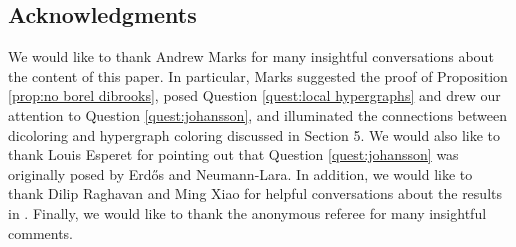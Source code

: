 \documentclass[psamsfonts]{amsart}
\theoremstyle{definition}
\theoremstyle{remark}
\numberwithin{equation}{section}
\begin{document}
\subsection*{Acknowledgments}
We would like to thank Andrew Marks for many insightful conversations about the content of this paper. In particular, Marks suggested the proof of Proposition \ref{prop:no borel dibrooks}, posed Question \ref{quest:local hypergraphs} and drew our attention to Question \ref{quest:johansson}, and illuminated the connections between dicoloring and hypergraph coloring discussed in Section 5. We would also like to thank Louis Esperet for pointing out that Question \ref{quest:johansson} was originally posed by Erd\H{o}s and Neumann-Lara. In addition, we would like to thank Dilip Raghavan and Ming Xiao for helpful conversations about the results in \cite{dx2024}. Finally, we would like to thank the anonymous referee for many insightful comments.



\end{document}

